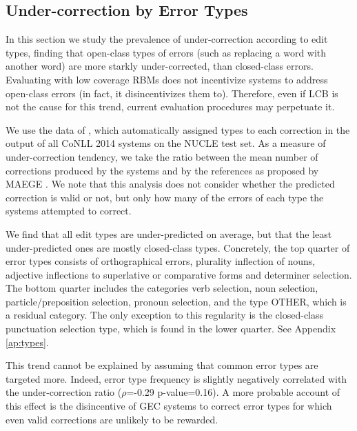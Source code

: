 \documentclass[11pt, a4paper]{article}
\begin{document}
\subsection{Under-correction by Error Types}\label{subsec:by_types}

In this section we study the prevalence of under-correction according to edit types, finding that open-class types of errors
(such as replacing a word with another word) are more starkly under-corrected, than closed-class errors.
Evaluating with low coverage RBMs does not incentivize systems to address open-class errors (in fact, it disincentivizes them to). Therefore, even if LCB is not the cause for this trend, current evaluation procedures may perpetuate it.

We use the data of \citet{bryant-felice-briscoe:2017:Long}, which automatically assigned types to each correction in the output of all CoNLL 2014 
systems on the NUCLE test set.
As a measure of under-correction tendency, we take the ratio between the mean number of corrections produced by the systems and by the references as proposed by {\sc MAEGE} \cite{choshen2018maege}. 
We note that this analysis does not consider whether the predicted correction is valid or not, but only how many of the errors of each type the systems attempted to correct. 

We find that all edit types are under-predicted on average, but that the least under-predicted ones are mostly closed-class types. 
Concretely, the top quarter of error types consists of orthographical errors, 
plurality inflection of nouns, 
adjective inflections to superlative or comparative forms and determiner selection. The bottom quarter includes the categories 
verb selection, noun selection, particle/preposition selection, pronoun selection, and the type {\sc OTHER}, which is a residual category.
The only exception to this regularity is the closed-class punctuation selection type, which is found in the lower quarter. See Appendix \ref{ap:types}.

This trend cannot be explained by assuming that common error types are targeted more.
Indeed, error type frequency is slightly negatively correlated with the under-correction ratio ($\rho$=-0.29 p-value=0.16).
A more probable account of this effect is the disincentive of GEC systems to correct error types for which even valid
corrections are unlikely to be rewarded.

\end{document}
